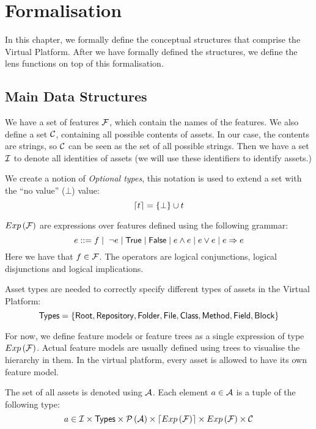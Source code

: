 \chapter{Formalisation}\label{sec:vp:formalisation}
In this chapter, we formally define the conceptual structures that comprise the
Virtual Platform. After we have formally defined the structures, we define the
lens functions on top of this formalisation.

\section{Main Data Structures}
We have a set of features \(\mathcal{F}\), which contain the names of the
features. We also define a set \(\mathcal{C}\), containing all possible
contents of assets. In our case, the contents are strings, so \(\mathcal{C}\)
can be seen as the set of all possible strings. Then we have a
set \(\mathcal{I}\) to denote all identities of assets (we will use these identifiers to
identify assets.)

\noindent
We create a notion of \emph{Optional types}, this notation is used to extend a set
with the ``no value'' (\( \bot \)) value:
\[
  \lceil t \rceil = \left\{ \bot \right\} \cup t
\]

\noindent
\( Exp \left( \mathcal{F} \right) \) are expressions over features defined using the
following grammar:
\[
  e ::= f \mid \hspace*{1mm} \neg e \mid {\sf True} \mid {\sf False} \mid {e}\land{e} \mid e \lor e \mid e \Rightarrow e
\]
Here we have that \( f \in \mathcal{F} \). The operators are logical conjunctions,
logical disjunctions and logical implications.

\noindent
Asset types are needed to correctly specify different types of assets in the
Virtual Platform:
\[
  {\sf Types} = \left\{ {\sf Root} , {\sf Repository} , {\sf Folder} , {\sf File} , {\sf Class} , {\sf Method} , {\sf Field} , {\sf Block} \right\}
\]

For now, we define feature models or feature trees as a single expression
of type \(Exp \left( \mathcal{F} \right)\). Actual feature models are usually defined
using trees to visualise the hierarchy in them. In the virtual platform, every
asset is allowed to have its own feature model.

\noindent
The set of all assets is denoted using \( \mathcal{A} \). Each element 
\(a \in \mathcal{A} \) is a tuple of the following type:
\[
  a \in \mathcal{I} \times {\sf Types} \times \mathcal{P} \left(\mathcal{A}\right) \times \lceil Exp \left( \mathcal{F} \right) \rceil \times Exp \left( \mathcal{F} \right) \times \mathcal{C}
\]

